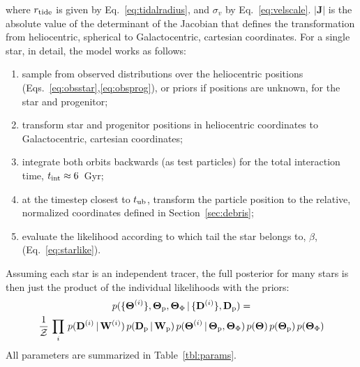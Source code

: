 \documentclass[letterpaper,12pt,preprint]{aastex}
\newcommand{\given}{\,|\,}
\newcommand{\D}{{\bf D}}
\newcommand{\W}{{\bf W}}
\newcommand{\J}{{\boldsymbol J}}
\newcommand{\rtide}{r_{\rm tide}}
\newcommand{\bs}{\boldsymbol}
\newcommand{\sat}{{\rm p}}
\newcommand{\tub}{t_{\rm ub}}
\newcommand{\tailbit}{\beta}
\newcommand{\Loffset}{\alpha}
\begin{document}
where $\rtide$ is given by Eq.~\ref{eq:tidalradius}, and $\sigma_v$ by Eq.~\ref{eq:velscale}. $\left\vert\J\right\vert$ is the absolute value of the determinant of the Jacobian that defines the transformation from heliocentric, spherical to Galactocentric, cartesian coordinates. For a single star, in detail, the model works as follows:
\begin{enumerate}
	\item sample from observed distributions over the heliocentric positions (Eqs.~\ref{eq:obsstar},\ref{eq:obsprog}), or priors if positions are unknown, for the star and progenitor;
	\item transform star and progenitor positions in heliocentric coordinates to Galactocentric, cartesian coordinates;
	\item integrate both orbits backwards (as test particles) for the total interaction time, $t_{\rm int}\approx6$~Gyr;
	\item at the timestep closest to $\tub$, transform the particle position to the relative, normalized coordinates defined in Section~\ref{sec:debris};
	\item evaluate the likelihood according to which tail the star belongs to, $\tailbit$, (Eq.~\ref{eq:starlike}).
\end{enumerate}
Assuming each star is an independent tracer, the full posterior for many stars is then just the product of the individual likelihoods with the priors:
\begin{multline}
	p(\{\bs{\Theta}^{(i)}\}, \bs{\Theta}_\sat, \bs{\Theta}_\Phi \given \{\D^{(i)}\}, \D_\sat) = \\
		\frac{1}{\mathcal{Z}} \, \prod_i \, p(\D^{(i)} \given \W^{(i)}) \, p(\D_\sat \given \W_\sat)\,
			p(\bs{\Theta}^{(i)} \given \bs{\Theta}_\sat, \bs{\Theta}_\Phi) \, 
			p(\bs{\Theta}) \, p(\bs{\Theta}_\sat)\,p(\bs{\Theta}_\Phi)
\end{multline}
All parameters are summarized in Table~\ref{tbl:params}. 
\end{document}
